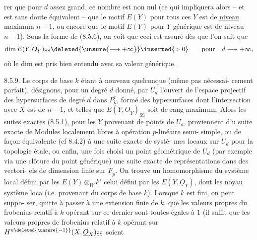 rer que pour $d$ assez grand, ce nombre est non nul (ce qui impliquera 
alors\deleted{,} -- et est sans doute équivalent -- que le motif $E(Y)$ pour tous
ces $Y$ est de \uline{niveau} maximum $n-1$, ou encore que le motif $E(Y)$ pour $Y$
générique est de niveau $n-1$). Sous la forme de (8.5.6)\deleted{\unsure{*}}, on voit que
ceci est assuré dès que l'on sait que
\[
\dim E(Y,\underline O_Y)_{\mathrm{SS}}\deleted{\unsure{\longrightarrow+\infty}}\inserted{>0}\qquad\text{pour}\quad d\longrightarrow+\infty,
\]
où le dim est pris bien entendu avec sa valeur générique.

8.5.9. Le corps de base $k$ étant à nouveau quelconque (même pas nécessai-
rement parfait), désignons, pour un degré $d$ donné, par $U_d$ l'ouvert de
l'espace projectif des hypersurfaces de degré $d$ dans $P^r_k$, formé des
hypersurfaces dont l'intersection avec $X$ est  de 
$n-1$, et telles que $E(Y,\underline O_Y)_{\mathrm{SS}}$ soit de rang maximum. Alors les suites
exactes (8.5.1), pour les $Y$ provenant de points de $U_d$, proviennent d'u
suite exacte de Modules localement libres  à opération $p$-linéaire semi-
simple, ou de façon équivalente (cf 8.4.2) à une suite exacte de systè-
mes locaux  sur $U_d$ pour la topologie étale,  ou enfin, une fois
choisi un point géométrique de $U_d$ (par exemple via une clôture 
du point générique) une suite exacte de représentations  dans des vectori-
els de dimension finie sur $\underline F_p$.  On trouve un homomorphisme \inserted{$\varphi$} du
système local défini par les $E(Y)\otimes_W k'$  celui défini par les
$E(Y,\underline O_Y)$, dont les noyau  système loca \uline{}
(i.e. provenant du corps de base $k$). Lorsque $k$ est fini, on peut suppo-
ser, quitte à passer à une extension finie de $k$, que les valeurs propres
du frobenius relatif à $k$ opérant sur ce dernier  sont toutes
égales à $1$ (il suffit que les valeurs propres de frobenius relatif à $k$
opérant sur  $H^{n\deleted{\unsure{-1}}}(X,\underline O_X)_{\mathrm{SS}}$  soient

